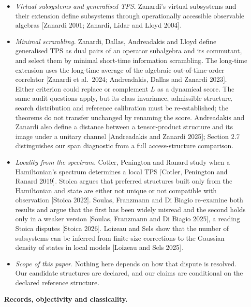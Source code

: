 \documentclass[
  10pt,
  a4paper,
]{article}
\providecommand{\tightlist}{%
  \setlength{\itemsep}{0pt}\setlength{\parskip}{0pt}}
\begin{document}
\begin{itemize}
\tightlist
\item
  \emph{Virtual subsystems and generalised TPS.} Zanardi's virtual
  subsystems and their extension define subsystems through operationally
  accessible observable algebras {[}Zanardi 2001; Zanardi, Lidar and
  Lloyd 2004{]}.
\item
  \emph{Minimal scrambling.} Zanardi, Dallas, Andreadakis and Lloyd
  define generalised TPS as dual pairs of an operator subalgebra and its
  commutant, and select them by minimal short-time information
  scrambling. The long-time extension uses the long-time average of the
  algebraic out-of-time-order correlator {[}Zanardi et al.~2024;
  Andreadakis, Dallas and Zanardi 2023{]}. Either criterion could
  replace or complement \(L\) as a dynamical score. The same audit
  questions apply, but its class invariance, admissible structure,
  search distribution and reference calibration must be re-established;
  the theorems do not transfer unchanged by renaming the score.
  Andreadakis and Zanardi also define a distance between a
  tensor-product structure and its image under a unitary channel
  {[}Andreadakis and Zanardi 2025{]}; Section 2.7 distinguishes our span
  diagnostic from a full access-structure comparison.
\item
  \emph{Locality from the spectrum.} Cotler, Penington and Ranard study
  when a Hamiltonian's spectrum determines a local TPS {[}Cotler,
  Penington and Ranard 2019{]}. Stoica argues that preferred structures
  built only from the Hamiltonian and state are either not unique or not
  compatible with observation {[}Stoica 2022{]}. Soulas, Franzmann and
  Di Biagio re-examine both results and argue that the first has been
  widely misread and the second holds only in a weaker version
  {[}Soulas, Franzmann and Di Biagio 2025{]}, a reading Stoica disputes
  {[}Stoica 2026{]}. Loizeau and Sels show that the number of subsystems
  can be inferred from finite-size corrections to the Gaussian density
  of states in local models {[}Loizeau and Sels 2025{]}.
\item
  \emph{Scope of this paper.} Nothing here depends on how that dispute
  is resolved. Our candidate structures are declared, and our claims are
  conditional on the declared reference structure.
\end{itemize}

\textbf{Records, objectivity and classicality.}
\end{document}
